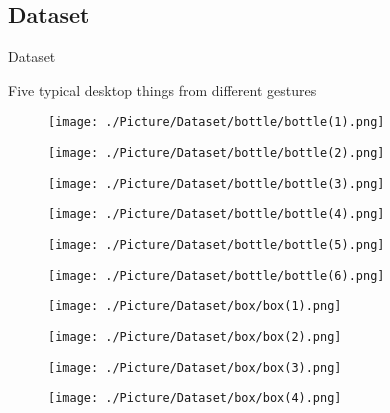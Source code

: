 \documentclass[xcolor=table,compress,blue]{beamer}
\begin{document}
\subsection{Dataset}
\begin{frame}{Dataset}
	\begin{exampleblock}{Five typical desktop things from different gestures}
		\begin{figure}[htpb]
			\centering
			\begin{minipage}[b]{0.65in}
				\centerline{ \texttt{[image: ./Picture/Dataset/bottle/bottle(1).png]} }
			\end{minipage}
			\begin{minipage}[b]{0.65in}
				\centerline{ \texttt{[image: ./Picture/Dataset/bottle/bottle(2).png]} }
			\end{minipage}
			\begin{minipage}[b]{0.65in}
				\centerline{ \texttt{[image: ./Picture/Dataset/bottle/bottle(3).png]} }
			\end{minipage}
			\begin{minipage}[b]{0.65in}
				\centerline{ \texttt{[image: ./Picture/Dataset/bottle/bottle(4).png]} }
			\end{minipage}
			\begin{minipage}[b]{0.65in}
				\centerline{ \texttt{[image: ./Picture/Dataset/bottle/bottle(5).png]} }
			\end{minipage}
			\begin{minipage}[b]{0.65in}
				\centerline{ \texttt{[image: ./Picture/Dataset/bottle/bottle(6).png]} }
			\end{minipage}
			\begin{minipage}[b]{0.65in}
				\centerline{ \texttt{[image: ./Picture/Dataset/box/box(1).png]} }
			\end{minipage}
			\begin{minipage}[b]{0.65in}
				\centerline{ \texttt{[image: ./Picture/Dataset/box/box(2).png]} }
			\end{minipage}
			\begin{minipage}[b]{0.65in}
				\centerline{ \texttt{[image: ./Picture/Dataset/box/box(3).png]} }
			\end{minipage}
			\begin{minipage}[b]{0.65in}
				\centerline{ \texttt{[image: ./Picture/Dataset/box/box(4).png]} }

\end{minipage}
\end{figure}
\end{exampleblock}
\end{frame}
\end{document}
